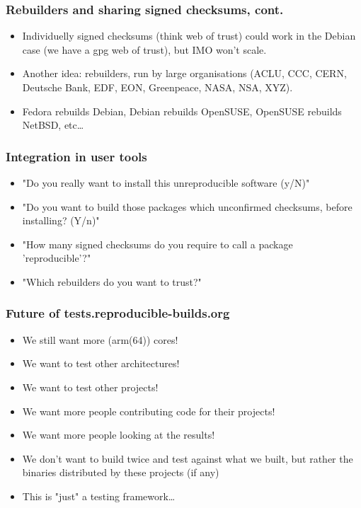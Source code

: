 \documentclass[14pt]{beamer}
\begin{document}
\begin{frame}
 \frametitle{Rebuilders and sharing signed checksums, cont.}
 \begin{itemize}
  \item Individuelly signed checksums (think web of trust) could work in the
  Debian case (we have a gpg web of trust), but IMO won't scale.
  \item<2-3> { Another idea: rebuilders, run by large organisations
  (ACLU, CCC, CERN, Deutsche Bank, EDF, EON, Greenpeace, NASA, NSA, XYZ).}
  \item<3> Fedora rebuilds Debian, Debian rebuilds OpenSUSE, OpenSUSE rebuilds
  NetBSD, etc…
 \end{itemize}
\end{frame}


\begin{frame}
 \frametitle{Integration in user tools}
 \begin{itemize}
  \item "Do you really want to install this unreproducible software (y/N)"
  \item<2-4> "Do you want to build those packages which unconfirmed checksums,
  before installing? (Y/n)"
  \item<3-4>{ "How many signed checksums do you require to call a package
  'reproducible'?"}
  \item<4>{ "Which rebuilders do you want to trust?"}
 \end{itemize}
\end{frame}

\begin{frame}
 \frametitle{Future of tests.reproducible-builds.org}

 \begin{itemize}
 \item We still want more (arm(64)) cores!
 \item We want to test other architectures!
 \item We want to test other projects!
 \item We want more people contributing code for their projects!
 \item We want more people looking at the results!
 \item We don't want to build twice and test against what we built, but rather
 the binaries distributed by these projects (if any)
 \item<2> This is "just" a testing framework…
\end{itemize}
\end{frame}
\end{document}
